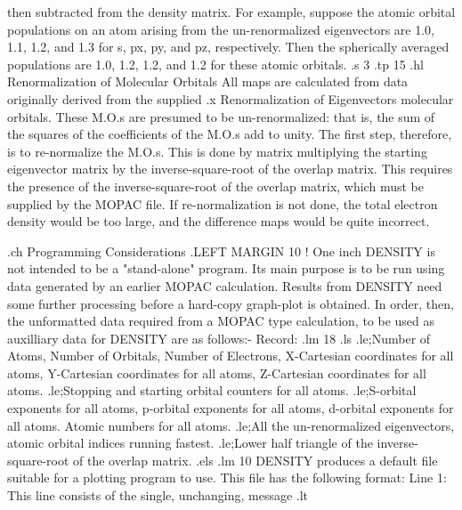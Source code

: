 then subtracted from the density matrix. For example, suppose the atomic
orbital populations on an atom arising from the un-renormalized eigenvectors 
are  1.0, 1.1, 1.2, and 1.3 for s, px, py, and pz, respectively. Then the
spherically averaged populations are 1.0, 1.2, 1.2, and 1.2 for these atomic
orbitals. 
.s 3
.tp 15
.hl Renormalization of Molecular Orbitals
  All maps are calculated from data originally derived from the supplied
.x Renormalization of Eigenvectors
molecular orbitals. These M.O.s are presumed to be un-renormalized: that
is, the sum of the squares of the coefficients of the M.O.s add to unity.
The first step, therefore, is to re-normalize the M.O.s. This is done
by matrix multiplying the starting eigenvector matrix by the 
inverse-square-root of the overlap matrix. This requires the presence of
the inverse-square-root of the overlap matrix, which must be supplied by
the MOPAC file. If re-normalization is not done, the total 
electron density would be too large, and the difference maps would be
quite incorrect.



.ch Programming Considerations
.LEFT MARGIN 10                 ! One inch
 DENSITY is not intended to be a "stand-alone" program. Its main purpose
is to be run using data generated by an earlier MOPAC calculation.
Results from DENSITY need some further processing before a hard-copy
graph-plot is obtained.
 In order, then, the unformatted data required from 
a MOPAC type calculation, to be used as auxilliary 
data for DENSITY are as follows:-
 Record:
.lm 18
.ls
.le;Number of Atoms, Number of Orbitals, Number of Electrons,
X-Cartesian coordinates for all atoms, Y-Cartesian coordinates for all atoms,
Z-Cartesian coordinates for all atoms.
.le;Stopping and starting orbital counters for all atoms.
.le;S-orbital exponents for all atoms, p-orbital exponents for all atoms, 
d-orbital exponents for all atoms. Atomic numbers for all atoms.
.le;All the un-renormalized eigenvectors, atomic orbital indices running
fastest.
.le;Lower half triangle of the inverse-square-root of the overlap matrix.
.els
.lm 10
 DENSITY produces a default file suitable for a plotting program to use. 
This file has the following format:
 Line 1: This line consists of the single, unchanging, message
.lt

